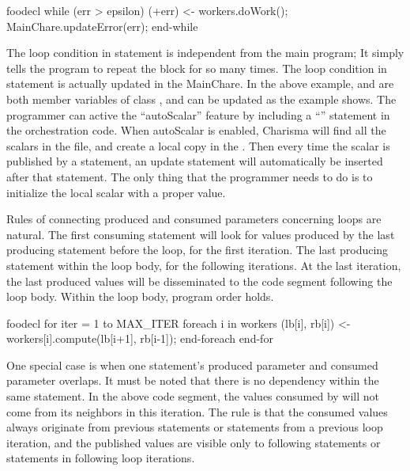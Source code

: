 \begin{SaveVerbatim}{foodecl}
  while (err > epsilon)
     (+err) <- workers.doWork();
     MainChare.updateError(err);
  end-while
\end{SaveVerbatim}

The loop condition in  statement is independent from the main program;
It simply tells the program to repeat the block for so many times. The loop
condition in  statement is actually updated in the MainChare. In the
above example,  and  are both member variables of class
, and can be updated as the example shows. The programmer can
active the ``autoScalar'' feature by including a ``''
statement in the orchestration code. When autoScalar is enabled,  Charisma will
find all the scalars in the  file, and create a local copy in the
. Then every time the scalar is published by a statement, an
update statement will automatically be inserted after that statement. The only
thing that the programmer needs to do is to initialize the local scalar with
a proper value. 

Rules of connecting produced and consumed parameters concerning loops are
natural. The first consuming statement will look for values produced by the last
producing statement before the loop, for the first iteration. The last
producing statement within the loop body, for the following iterations. At the
last iteration, the last produced values will be disseminated to the code
segment following the loop body. Within the loop body, program order holds. 

\begin{SaveVerbatim}{foodecl}
  for iter = 1 to MAX_ITER
    foreach i in workers
      (lb[i], rb[i]) <- workers[i].compute(lb[i+1], rb[i-1]);
    end-foreach
  end-for
\end{SaveVerbatim}

One special case is when one statement's produced parameter and consumed
parameter overlaps. It must be noted that there is no dependency within the same
 statement. In the above code segment, the values consumed
 by  will not come from  
its neighbors in this iteration. The rule is that the consumed values always
originate from previous  statements or  statements
from a previous loop iteration, and the published values are visible only to
following  statements or  statements in following
loop iterations. 

